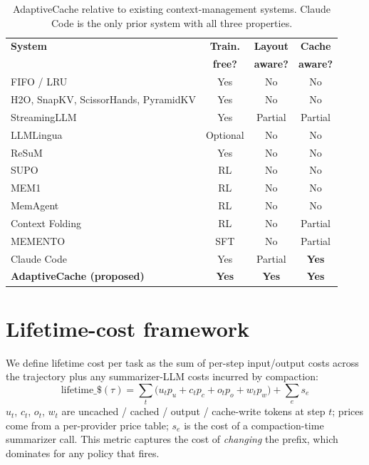 \documentclass[letterpaper,twocolumn,10pt]{article}
\newcommand{\sysname}{AdaptiveCache}
\begin{document}
\begin{table}[h]
\centering\small
\setlength{\tabcolsep}{4pt}
\begin{tabular}{lccc}
\toprule
\textbf{System} & \textbf{Train.} & \textbf{Layout} & \textbf{Cache} \\
                & \textbf{free?}  & \textbf{aware?} & \textbf{aware?} \\
\midrule
FIFO / LRU                              & Yes & No  & No \\
H2O, SnapKV, ScissorHands, PyramidKV    & Yes & No  & No \\
StreamingLLM~\cite{xiao2024streamingllm}                  & Yes & Partial & Partial \\
LLMLingua~\cite{jiang2023llmlingua,jiang2024longllmlingua}  & Optional & No & No \\
ReSuM~\cite{wu2025resum}                                  & Yes & No  & No \\
SUPO~\cite{lu2025supo}                                    & RL  & No  & No \\
MEM1~\cite{zhou2025mem1}                                  & RL  & No  & No \\
MemAgent~\cite{yu2025memagent}                            & RL  & No  & No \\
Context Folding~\cite{sun2025contextfolding}              & RL  & No  & Partial \\
MEMENTO~\cite{kontonis2026memento}                        & SFT & No  & Partial \\
Claude Code~\cite{claudecode2025}                         & Yes & Partial & \textbf{Yes} \\
\midrule
\textbf{\sysname{} (proposed)}                            & \textbf{Yes} & \textbf{Yes} & \textbf{Yes} \\
\bottomrule
\end{tabular}
\caption{\sysname{} relative to existing context-management systems.
Claude Code is the only prior system with all three properties.}
\label{tab:related}
\end{table}

\section{Lifetime-cost framework}
\label{sec:framework}

We define lifetime cost per task as the sum of per-step
input/output costs across the trajectory plus any summarizer-LLM
costs incurred by compaction:
\[
\mathrm{lifetime\_\$}(\tau) = \sum_t \big(
  u_t p_u + c_t p_c + o_t p_o + w_t p_w
\big) + \sum_e s_e
\]
$u_t$, $c_t$, $o_t$, $w_t$ are uncached / cached / output /
cache-write tokens at step $t$; prices come from a per-provider
price table; $s_e$ is the cost of a compaction-time summarizer
call. This metric captures the cost of \emph{changing} the
prefix, which dominates for any policy that fires.
\end{document}
